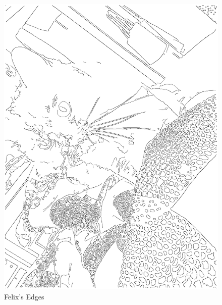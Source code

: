 \begin{frame}
\begin{columns}
\begin{column}{0.5\textwidth}
\begin{center}
\begin{figure}
				\includegraphics[width=0.8\linewidth]{images/KadseCanny}
				\caption[Felix's Edges]{Felix's Edges}
				\label{fig:kadseCanny}
			\end{figure}
			\end{center}
		\end{column}
	\end{columns}
\end{frame}

